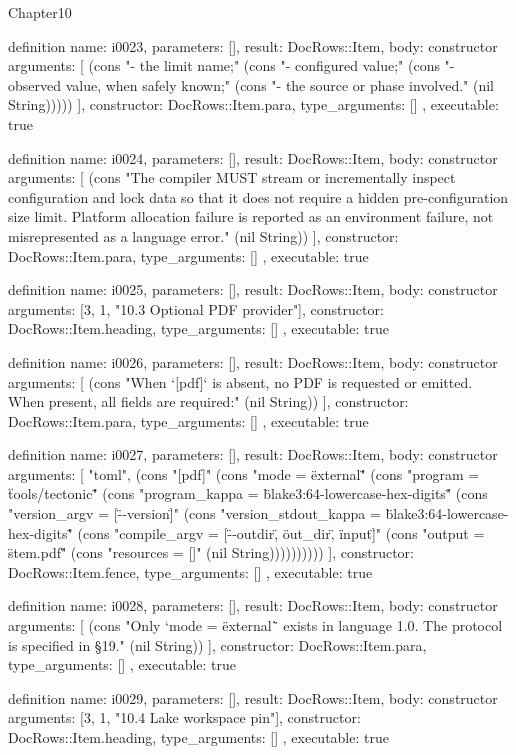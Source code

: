 \begin{lexlean}{Chapter10}
\begin{semanticmodule}
definition{
  name: i0023,
  parameters: [],
  result: DocRows::Item,
  body: constructor{
    arguments: [
      (cons "- the limit name;" (cons "- configured value;" (cons "- observed value, when safely known;" (cons "- the source or phase involved." (nil String)))))
    ],
    constructor: DocRows::Item.para,
    type_arguments: []
  },
  executable: true
}

definition{
  name: i0024,
  parameters: [],
  result: DocRows::Item,
  body: constructor{
    arguments: [
      (cons "The compiler MUST stream or incrementally inspect configuration and lock data so that it does not require a hidden pre-configuration size limit. Platform allocation failure is reported as an environment failure, not misrepresented as a language error." (nil String))
    ],
    constructor: DocRows::Item.para,
    type_arguments: []
  },
  executable: true
}

definition{
  name: i0025,
  parameters: [],
  result: DocRows::Item,
  body: constructor{
    arguments: [3, 1, "10.3 Optional PDF provider"],
    constructor: DocRows::Item.heading,
    type_arguments: []
  },
  executable: true
}

definition{
  name: i0026,
  parameters: [],
  result: DocRows::Item,
  body: constructor{
    arguments: [
      (cons "When `[pdf]` is absent, no PDF is requested or emitted. When present, all fields are required:" (nil String))
    ],
    constructor: DocRows::Item.para,
    type_arguments: []
  },
  executable: true
}

definition{
  name: i0027,
  parameters: [],
  result: DocRows::Item,
  body: constructor{
    arguments: [
      "toml",
      (cons "[pdf]" (cons "mode = \"external\"" (cons "program = \"tools/tectonic\"" (cons "program_kappa = \"blake3:64-lowercase-hex-digits\"" (cons "version_argv = [\"--version\"]" (cons "version_stdout_kappa = \"blake3:64-lowercase-hex-digits\"" (cons "compile_argv = [\"--outdir\", \"{out_dir}\", \"{input}\"]" (cons "output = \"{stem}.pdf\"" (cons "resources = []" (nil String))))))))))
    ],
    constructor: DocRows::Item.fence,
    type_arguments: []
  },
  executable: true
}

definition{
  name: i0028,
  parameters: [],
  result: DocRows::Item,
  body: constructor{
    arguments: [
      (cons "Only `mode = \"external\"` exists in language 1.0. The protocol is specified in §19." (nil String))
    ],
    constructor: DocRows::Item.para,
    type_arguments: []
  },
  executable: true
}

definition{
  name: i0029,
  parameters: [],
  result: DocRows::Item,
  body: constructor{
    arguments: [3, 1, "10.4 Lake workspace pin"],
    constructor: DocRows::Item.heading,
    type_arguments: []
  },
  executable: true
}


\end{semanticmodule}
\end{lexlean}
